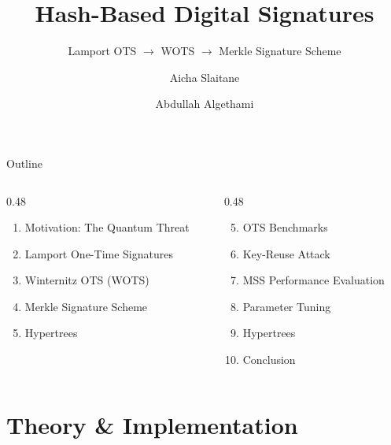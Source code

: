 \documentclass[aspectratio=169, 10pt]{beamer}
\title{Hash-Based Digital Signatures}
\subtitle{Lamport OTS \(\to\) WOTS \(\to\) Merkle Signature Scheme}
\author{Aicha Slaitane \and Abdullah Algethami}
\institute{Applied Cryptography (CS 232) --- KAUST}
\date{}
\begin{document}
\maketitle

\begin{frame}{Outline}
\begin{columns}[t]
\begin{column}{0.48\textwidth}
\begin{enumerate}
    \item Motivation: The Quantum Threat
    \item Lamport One-Time Signatures
    \item Winternitz OTS (WOTS)
    \item Merkle Signature Scheme
    \item Hypertrees
\end{enumerate}
\end{column}
\begin{column}{0.48\textwidth}
\begin{enumerate}\setcounter{enumi}{4}
    \item OTS Benchmarks
    \item Key-Reuse Attack
    \item MSS Performance Evaluation
    \item Parameter Tuning
    \item Hypertrees
    \item Conclusion
\end{enumerate}
\end{column}
\end{columns}
\end{frame}

\section{Theory \& Implementation}
\end{document}
